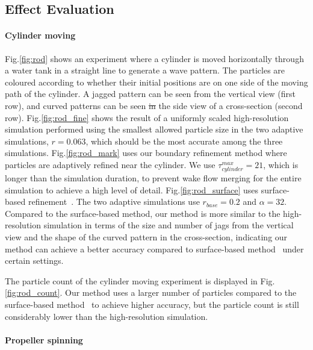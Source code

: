 \documentclass[VANCOUVER,STIX1COL]{WileyNJD-v2}
\providecommand{\DIFadd}[1]{{\protect\color{blue}\uwave{#1}}} %
\providecommand{\DIFdel}[1]{{\protect\color{red}\sout{#1}}}                      %
\providecommand{\DIFaddbegin}{} %
\providecommand{\DIFaddend}{} %
\providecommand{\DIFdelbegin}{} %
\providecommand{\DIFdelend}{} %
\begin{document}
\subsection{Effect Evaluation}


\paragraph{Cylinder moving}

Fig.\ref{fig:rod} shows an experiment where a cylinder is moved horizontally through a water tank in a straight line to generate a wave pattern. The particles are coloured according to whether their initial positions are on one side of the moving path of the cylinder. A jagged pattern can be seen from the vertical view (first row), and curved patterns can be seen \DIFdelbegin \DIFdel{in }\DIFdelend \DIFaddbegin \DIFadd{from }\DIFaddend the side view of a cross-section (second row). Fig.\ref{fig:rod_fine} shows the result of a uniformly scaled high-resolution simulation performed using the smallest allowed particle size in the two adaptive simulations, $r = 0.063$, which should be the most accurate among the three simulations. Fig.\ref{fig:rod_mark} uses our boundary refinement method where particles are adaptively refined near the cylinder. We use $\tau_{cylinder}^{max} = 21$, which is longer than the simulation duration, to prevent wake flow merging for the entire simulation to achieve a high level of detail. Fig.\ref{fig:rod_surface} uses surface-based refinement~\cite{Winchenbach17}. The two adaptive simulations use $r_{base} = 0.2$ and $\alpha = 32$. Compared to the surface-based method, our method is more similar to the high-resolution simulation in terms of the size and number of jags from the vertical view and the shape of the curved pattern in the cross-section, indicating our method can achieve a better accuracy compared to surface-based method~\cite{Winchenbach17} under certain settings.

The particle count of the cylinder moving experiment is displayed in Fig.\ref{fig:rod_count}. Our method uses a larger number of particles compared to the surface-based method~\cite{Winchenbach17} to achieve higher accuracy, but the particle count is still considerably lower than the high-resolution simulation.

\paragraph{Propeller spinning}
\end{document}
